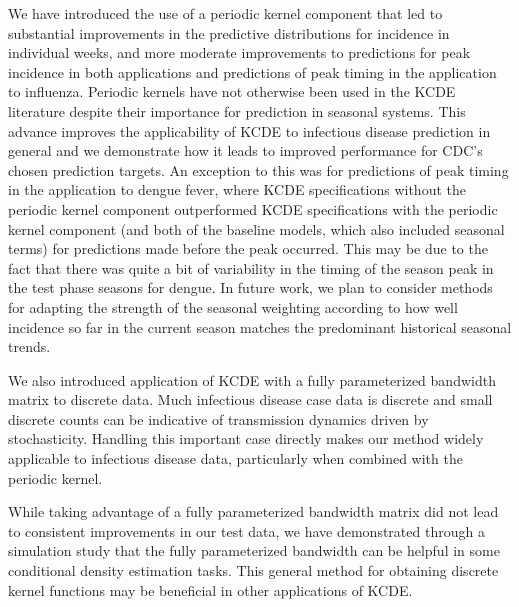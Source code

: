 \documentclass[times, doublespace]{simauth}\usepackage[]{graphicx}\usepackage[]{color}
\begin{document}
We have introduced the use of a periodic kernel component that led to substantial improvements in the predictive distributions for incidence in individual weeks, and more moderate improvements to predictions for peak incidence in both applications and predictions of peak timing in the application to influenza.  Periodic kernels have not otherwise been used in the KCDE literature despite their importance for prediction in seasonal systems. This advance improves the applicability of KCDE to infectious disease prediction in general and we demonstrate how it leads to improved performance for CDC's chosen prediction targets.  An exception to this was for predictions of peak timing in the application to dengue fever, where KCDE specifications without the periodic kernel component outperformed KCDE specifications with the periodic kernel component (and both of the baseline models, which also included seasonal terms) for predictions made before the peak occurred.  This may be due to the fact that there was quite a bit of variability in the timing of the season peak in the test phase seasons for dengue.  In future work, we plan to consider methods for adapting the strength of the seasonal weighting according to how well incidence so far in the current season matches the predominant historical seasonal trends.

We also introduced application of KCDE with a fully parameterized bandwidth matrix to discrete data. Much infectious disease case data is discrete and small discrete counts can be indicative of transmission dynamics driven by stochasticity. Handling this important case directly makes our method widely applicable to infectious disease data, particularly when combined with the periodic kernel.

While taking advantage of a fully parameterized bandwidth matrix did not lead to consistent improvements in our test data, we have demonstrated through a simulation study that the fully parameterized bandwidth can be helpful in some conditional density estimation tasks. This general method for obtaining discrete kernel functions may be beneficial in other applications of KCDE.

\end{document}
